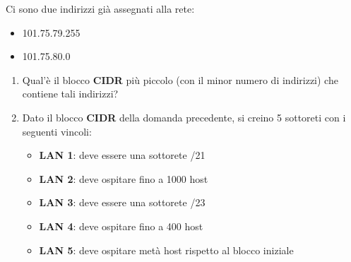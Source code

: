 \documentclass[a4paper]{article}
\begin{document}
\noindent
Ci sono due indirizzi già assegnati alla rete:
\begin{itemize}
  \item 101.75.79.255
  \item 101.75.80.0
\end{itemize}

\begin{enumerate}
  \item Qual'è il blocco \textbf{CIDR} più piccolo (con il minor numero di indirizzi) che
    contiene tali indirizzi?
  \item Dato il blocco \textbf{CIDR} della domanda precedente, si creino 5 sottoreti con
    i seguenti vincoli:
\begin{itemize}
  \item \textbf{LAN 1}: deve essere una sottorete /21

  \item \textbf{LAN 2}: deve ospitare fino a 1000 host

  \item \textbf{LAN 3}: deve essere una sottorete /23
  \item \textbf{LAN 4}: deve ospitare fino a 400 host

  \item \textbf{LAN 5}: deve ospitare metà host rispetto al blocco iniziale
\end{itemize}
\end{enumerate}
\end{document}
